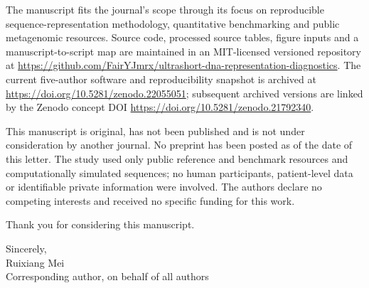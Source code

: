 \documentclass[10pt]{article}
\begin{document}
The manuscript fits the journal's scope through its focus on reproducible sequence-representation methodology, quantitative benchmarking and public metagenomic resources. Source code, processed source tables, figure inputs and a manuscript-to-script map are maintained in an MIT-licensed versioned repository at \url{https://github.com/FairYJmrx/ultrashort-dna-representation-diagnostics}. The current five-author software and reproducibility snapshot is archived at \url{https://doi.org/10.5281/zenodo.22055051}; subsequent archived versions are linked by the Zenodo concept DOI \url{https://doi.org/10.5281/zenodo.21792340}.

This manuscript is original, has not been published and is not under consideration by another journal. No preprint has been posted as of the date of this letter. The study used only public reference and benchmark resources and computationally simulated sequences; no human participants, patient-level data or identifiable private information were involved. The authors declare no competing interests and received no specific funding for this work.

Thank you for considering this manuscript.

Sincerely,\\[8pt]
Ruixiang Mei\\
Corresponding author, on behalf of all authors
\end{document}
